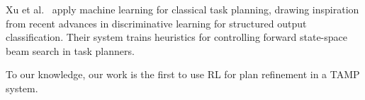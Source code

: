Xu et al.~\cite{Xu07discriminativelearning} apply machine learning for classical task
planning, drawing inspiration from recent advances in discriminative learning for
structured output classification. Their system trains heuristics for controlling forward
state-space beam search in task planners.

To our knowledge, our work is the first to use RL for plan refinement in a TAMP system.
